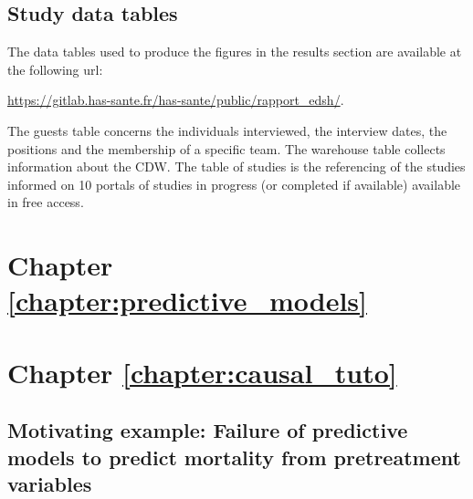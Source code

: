\documentclass[french,12pt,twoside,a4paper]{book}
\begin{document}
\begin{appendices}
\begin{landscape}
\begin{table}[h!]
    \end{table}
  \end{landscape}

  \section{Study data tables}\label{apd:cdw:study_tables}

  The data tables used to produce the figures in the results section are available
  at the following url:

  \url{https://gitlab.has-sante.fr/has-sante/public/rapport_edsh/}.

  The guests table concerns the individuals interviewed, the interview dates, the
  positions and the membership of a specific team. The warehouse table collects
  information about the CDW. The table of studies is the referencing of the
  studies informed on 10 portals of studies in progress (or completed if
  available) available in free access.

  \chapter{Chapter \ref{chapter:predictive_models}}\label{apd:predictive_models}


  \chapter{Chapter \ref{chapter:causal_tuto}}\label{apd:causal_tuto}

  \section{Motivating example: Failure of predictive models to predict mortality
    from pretreatment variables}%
  \label{apd:motivating_example}%


\end{appendices}
\end{document}
